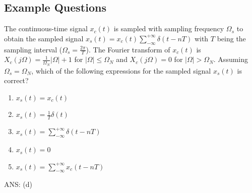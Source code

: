\subsection{Example Questions}
\begin{q}{}
The continuous-time signal $x_{c}(t)$ is sampled with sampling frequency $\Omega_{s}$ to obtain the sampled signal $x_{s}(t) = x_{c}(t) \sum_{-\infty}^{+\infty} \delta(t-nT)$ with $T$ being the sampling interval ($\Omega_s = \frac{2\pi}{T}$). The Fourier transform of $x_{c}(t)$ is $X_{c}(j\Omega) = \frac{1}{\Omega_{N}} \lvert \Omega \rvert + 1$ for $\lvert \Omega \rvert \leq \Omega_N$ and $X_{c}(j\Omega) = 0$ for $\lvert \Omega \rvert > \Omega_N$. Assuming $\Omega_{s} = \Omega_{N}$, which of the following expressions for the sampled signal $x_{s}(t)$ is correct? 

\begin{enumerate}[label=(\alph*)]
    \item $x_{s}(t) = x_{c}(t)$
    \item $x_{s}(t) = \frac{1}{T}\delta(t)$
    \item $x_{s}(t) = \sum_{-\infty}^{+\infty} \delta(t-nT)$
    \item $x_{s}(t) = 0$
    \item $x_{s}(t) = \sum_{-\infty}^{+\infty} x_{c}(t-nT)$
\end{enumerate}

\begin{flushright}
\begin{blueenv}
    ANS: (d)
\end{blueenv}
\end{flushright}

\end{q}

